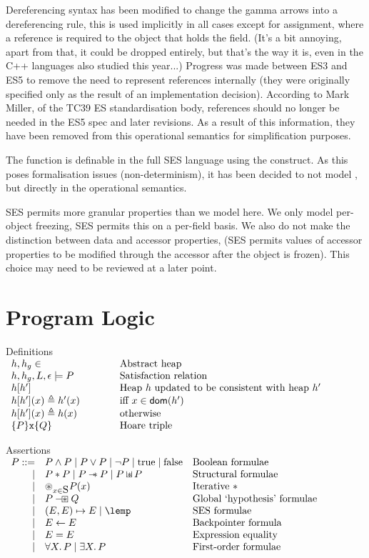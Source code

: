 \documentclass[a4paper]{article}
\begin{document}
Dereferencing syntax has been modified to change the gamma arrows into a
dereferencing rule, this is used implicitly in all cases except for assignment,
where a reference is required to the object that holds the field. (It's a bit
annoying, apart from that, it could be dropped entirely, but that's the way it
is, even in the C++ languages also studied this year...)
Progress was
made between ES3 and ES5 to remove the need to represent references internally
(they were originally specified only as the result of an implementation
decision). According to Mark Miller, of the TC39 ES standardisation body,
references should no longer be needed in the ES5 spec and later revisions. As a
result of this information, they have been removed from this operational
semantics for simplification purposes.

The  function is definable in the full SES language using the
 construct. As this poses formalisation issues (non-determinism),
it has been decided to not model , but  directly in the
operational semantics.

SES permits more granular properties than we model here. We only model
per-object freezing, SES permits this on a per-field basis. We also do not make
the distinction between data and accessor properties, (SES permits values of
accessor properties to be modified through the accessor after the object is
frozen). This choice may need to be reviewed at a later point.

\section{Program Logic}

\newcommand{\defline}[2]{#1 & \qquad & \text{#2}\\}
\begin{display}{Definitions}
  $\begin{array}{lll}
    \defline{h,h_g \in}{Abstract heap}
    \defline{h,h_g,L,\env \satisfies P}{Satisfaction relation}
    \defline{h[h']}{Heap $h$ updated to be consistent with heap $h'$}
    \defline{h[h'](x) \triangleq h'(x)}{iff $x \in \dom(h')$}
    \defline{h[h'](x) \triangleq h(x)}{otherwise}
    \defline{\tr{P}{\js{x}}{Q}}{Hoare triple}
  \end{array}$
\end{display}

\newcommand{\asrtline}[3][\pipe]{#1 & #2 & \text{#3}\\}
\begin{display}{Assertions}
  $\begin{array}{rll}
    \asrtline[P ::=]{P \land P \pipe P \lor P \pipe \lnot P \pipe \true \pipe
    \false}{Boolean formulae}
    \asrtline{P \sep P \pipe P \wand P \pipe P \sepish P}{Structural formulae}
    \asrtline{\bigsep_{x \in \T{S}} P(x)}{Iterative $\sep$}
    \asrtline{P \boxwand Q}{Global `hypothesis' formulae}
    \asrtline{(E,E) \pointsto E \pipe \lemp}{SES formulae}
    \asrtline{E \bp E}{Backpointer formula}
    \asrtline{E = E}{Expression equality}
    \asrtline{\forall X \st P \pipe \exists X \st P}{First-order formulae}
  \end{array}$
\end{display}
\end{document}
